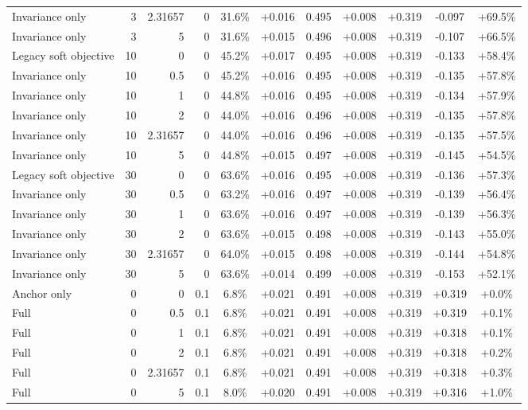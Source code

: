 \begin{table}[htbp]
\begin{tabular}{lrrrccccccc}
Invariance only & 3 & 2.31657 & 0 & 31.6\% & +0.016 & 0.495 & +0.008 & +0.319 & -0.097 & +69.5\% \\
Invariance only & 3 & 5 & 0 & 31.6\% & +0.015 & 0.496 & +0.008 & +0.319 & -0.107 & +66.5\% \\
Legacy soft objective & 10 & 0 & 0 & 45.2\% & +0.017 & 0.495 & +0.008 & +0.319 & -0.133 & +58.4\% \\
Invariance only & 10 & 0.5 & 0 & 45.2\% & +0.016 & 0.495 & +0.008 & +0.319 & -0.135 & +57.8\% \\
Invariance only & 10 & 1 & 0 & 44.8\% & +0.016 & 0.495 & +0.008 & +0.319 & -0.134 & +57.9\% \\
Invariance only & 10 & 2 & 0 & 44.0\% & +0.016 & 0.496 & +0.008 & +0.319 & -0.135 & +57.8\% \\
Invariance only & 10 & 2.31657 & 0 & 44.0\% & +0.016 & 0.496 & +0.008 & +0.319 & -0.135 & +57.5\% \\
Invariance only & 10 & 5 & 0 & 44.8\% & +0.015 & 0.497 & +0.008 & +0.319 & -0.145 & +54.5\% \\
Legacy soft objective & 30 & 0 & 0 & 63.6\% & +0.016 & 0.495 & +0.008 & +0.319 & -0.136 & +57.3\% \\
Invariance only & 30 & 0.5 & 0 & 63.2\% & +0.016 & 0.497 & +0.008 & +0.319 & -0.139 & +56.4\% \\
Invariance only & 30 & 1 & 0 & 63.6\% & +0.016 & 0.497 & +0.008 & +0.319 & -0.139 & +56.3\% \\
Invariance only & 30 & 2 & 0 & 63.6\% & +0.015 & 0.498 & +0.008 & +0.319 & -0.143 & +55.0\% \\
Invariance only & 30 & 2.31657 & 0 & 64.0\% & +0.015 & 0.498 & +0.008 & +0.319 & -0.144 & +54.8\% \\
Invariance only & 30 & 5 & 0 & 63.6\% & +0.014 & 0.499 & +0.008 & +0.319 & -0.153 & +52.1\% \\
Anchor only & 0 & 0 & 0.1 & 6.8\% & +0.021 & 0.491 & +0.008 & +0.319 & +0.319 & +0.0\% \\
Full & 0 & 0.5 & 0.1 & 6.8\% & +0.021 & 0.491 & +0.008 & +0.319 & +0.319 & +0.1\% \\
Full & 0 & 1 & 0.1 & 6.8\% & +0.021 & 0.491 & +0.008 & +0.319 & +0.318 & +0.1\% \\
Full & 0 & 2 & 0.1 & 6.8\% & +0.021 & 0.491 & +0.008 & +0.319 & +0.318 & +0.2\% \\
Full & 0 & 2.31657 & 0.1 & 6.8\% & +0.021 & 0.491 & +0.008 & +0.319 & +0.318 & +0.3\% \\
Full & 0 & 5 & 0.1 & 8.0\% & +0.020 & 0.491 & +0.008 & +0.319 & +0.316 & +1.0\% \\

\end{tabular}
\end{table}
